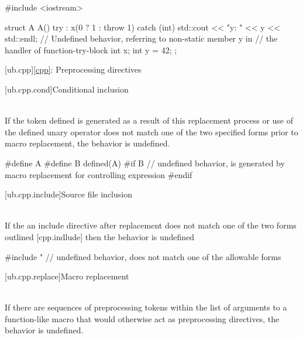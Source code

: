 {\pnum
\begin{example}
\begin{codeblock}
#include <iostream>

struct A {
  A() try : x(0 ? 1 : throw 1) {
  } catch (int) {
    std::cout << "y: " << y << std::endl;   // Undefined behavior, referring to non-static member y in
                                            // the handler of function-try-block
  }
  int x;
  int y = 42;
};
\end{codeblock}
\end{example}


[ub.cpp]{\ref{cpp}: Preprocessing directives}

[ub.cpp.cond]{Conditional inclusion}

\pnum
{} \\
If the token defined is generated as a result of this replacement process or use of
the defined unary operator does not match one of the two specified forms prior to macro replacement, the
behavior is undefined.

\pnum
\begin{example}
\begin{codeblock}
#define A
#define B defined(A)
#if B                   // undefined behavior,  is generated by macro replacement for controlling expression
#endif
\end{codeblock}
\end{example}


[ub.cpp.include]{Source file inclusion}

\pnum
{} \\
If the an include directive after replacement does not match one of the two forms
outlined [cpp.indlude] then the behavior is undefined

\pnum
\begin{example}
\begin{codeblock}
#include "              // undefined behavior, does not match one of the allowable forms
\end{codeblock}
\end{example}


[ub.cpp.replace]{Macro replacement}

\pnum
{} \\
If there are sequences of preprocessing tokens within the list of arguments to a function-like macro
that would otherwise act as preprocessing directives, the behavior is undefined.

}

